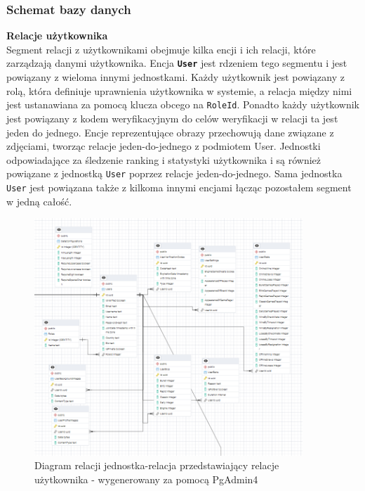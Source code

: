 \documentclass[12pt,a4paper]{article}
\begin{document}
\newpage

\subsubsection{Schemat bazy danych}

\noindent \textbf{Relacje użytkownika}\\
Segment relacji z użytkownikami obejmuje kilka encji i ich relacji, które zarządzają danymi użytkownika. Encja \textbf{\texttt{User}} jest rdzeniem tego segmentu i jest powiązany z wieloma innymi jednostkami. Każdy użytkownik jest powiązany z rolą, która definiuje uprawnienia użytkownika w systemie, a relacja między nimi jest ustanawiana za pomocą klucza obcego na \texttt{RoleId}. Ponadto każdy użytkownik jest powiązany z kodem weryfikacyjnym do celów weryfikacji w relacji ta jest jeden do jednego. Encje reprezentujące obrazy przechowują dane związane z zdjęciami, tworząc relacje jeden-do-jednego z podmiotem User. Jednostki odpowiadające za śledzenie ranking i statystyki użytkownika i są również powiązane z jednostką \texttt{User} poprzez relacje jeden-do-jednego. Sama jednostka \texttt{User} jest powiązana także z kilkoma innymi encjami łącząc pozostałem segment w jedną całość.

\vspace{1cm}
\begin{figure}[h!]
    \centering
    \includegraphics[width=0.9\textwidth]{images/ERD_user.png}
    \caption{Diagram relacji jednostka-relacja przedstawiający relacje użytkownika - wygenerowany za pomocą PgAdmin4}
\end{figure}
\end{document}
